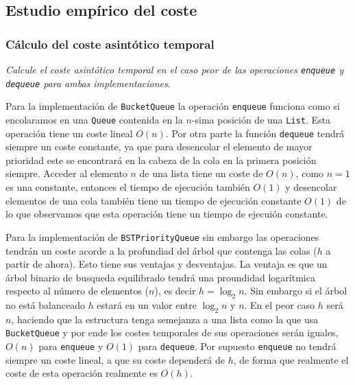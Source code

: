 \documentclass[a4paper, 12pt]{article}
\begin{document}
        \subsection{Estudio empírico del coste}

            \subsubsection{Cálculo del coste asintótico temporal}

                \textit{Calcule el coste asintótico temporal en el caso peor de
                las operaciones \texttt{enqueue} y \texttt{dequeue} para ambas
                implementaciones}.\\\mbox{}

                Para la implementación de \texttt{BucketQueue} la operación
                \texttt{enqueue} funciona como si encolaramos en una 
                \texttt{Queue} contenida en la $n$-sima posición de una 
                \texttt{List}. Esta operación tiene un coste lineal $O(n)$.
                Por otra parte la función \texttt{dequeue} tendrá siempre un 
                coste constante, ya que para desencolar el elemento de mayor 
                prioridad este se encontrará en la cabeza de la cola en la
                primera posición siempre. Acceder al elemento $n$ de una lista 
                tiene un coste de $O(n)$, como $n=1$ es una constante, entonces 
                el tiempo de ejecución también $O(1)$ y desencolar elementos de
                una cola también tiene un tiempo de ejecución constante $O(1)$ 
                de lo que observamos que esta operación tiene un tiempo de 
                ejecuión constante.
                \\\mbox{}

                Para la implementación de \texttt{BSTPriorityQueue} sin embargo
                las operaciones tendrán un coste acorde a la profundiad del 
                árbol que contenga las colas ($h$ a partir de ahora). Esto tiene 
                sus ventajas y desventajas. La ventaja es que un árbol binario 
                de busqueda equilibrado tendrá una proundidad logarítmica 
                respecto al número de elementos ($n$), es decir $h = \log_2 n$. 
                Sin embargo si el árbol no está balanceado $h$ estará 
                en un valor entre $\log_2 n$ y $n$. En el peor caso $h$ será $n$,
                haciendo que la estructura tenga semejanza a una lista como la 
                que usa \texttt{BucketQueue} y por ende los costes temporales de 
                sus operaciones serán iguales, $O(n)$ para \texttt{enqueue} y 
                $O(1)$ para \texttt{dequeue}. Por supuesto \texttt{enqueue} no 
                tendrá siempre un coste lineal, a que su coste dependerá de $h$,
                de forma que realmente el coste de esta operación realmente es 
                $O(h)$.\\\mbox{}
\end{document}
